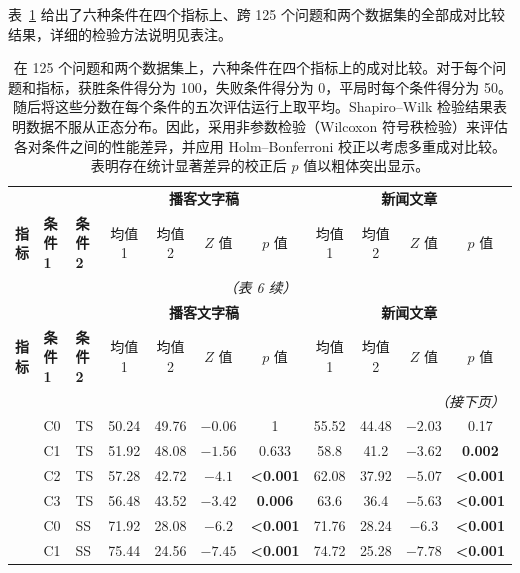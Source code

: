 \documentclass[11pt,UTF8,fontset=fandol]{ctexart}
\begin{document}
表~\ref{tab:6} 给出了六种条件在四个指标上、跨 125 个问题和两个数据集的全部成对比较结果，详细的检验方法说明见表注。

\begin{center}
\scriptsize
\setlength{\tabcolsep}{4pt}
\renewcommand{\arraystretch}{1.1}
\begin{longtable}{@{}lll cccc cccc@{}}
\caption{在 125 个问题和两个数据集上，六种条件在四个指标上的成对比较。对于每个问题和指标，获胜条件得分为 100，失败条件得分为 0，平局时每个条件得分为 50。随后将这些分数在每个条件的五次评估运行上取平均。Shapiro--Wilk 检验结果表明数据不服从正态分布。因此，采用非参数检验（Wilcoxon 符号秩检验）来评估各对条件之间的性能差异，并应用 Holm--Bonferroni 校正以考虑多重成对比较。表明存在统计显著差异的校正后 $p$ 值以粗体突出显示。}
\label{tab:6}\\
\toprule
& & & \multicolumn{4}{c}{\textbf{播客文字稿}} & \multicolumn{4}{c}{\textbf{新闻文章}} \\
\cmidrule(lr){4-7}\cmidrule(lr){8-11}
\textbf{指标} & \textbf{条件 1} & \textbf{条件 2} & 均值 1 & 均值 2 & $Z$ 值 & $p$ 值 & 均值 1 & 均值 2 & $Z$ 值 & $p$ 值 \\
\midrule
\endfirsthead
\multicolumn{11}{c}{\textit{（表 6 续）}}\\
\toprule
& & & \multicolumn{4}{c}{\textbf{播客文字稿}} & \multicolumn{4}{c}{\textbf{新闻文章}} \\
\cmidrule(lr){4-7}\cmidrule(lr){8-11}
\textbf{指标} & \textbf{条件 1} & \textbf{条件 2} & 均值 1 & 均值 2 & $Z$ 值 & $p$ 值 & 均值 1 & 均值 2 & $Z$ 值 & $p$ 值 \\
\midrule
\endhead
\midrule
\multicolumn{11}{r}{\textit{（接下页）}}\\
\endfoot
\bottomrule
\endlastfoot
\multirow{15}{*}{全面性}
 & C0 & TS & 50.24 & 49.76 & $-0.06$ & 1 & 55.52 & 44.48 & $-2.03$ & 0.17 \\
 & C1 & TS & 51.92 & 48.08 & $-1.56$ & 0.633 & 58.8 & 41.2 & $-3.62$ & \textbf{0.002} \\
 & C2 & TS & 57.28 & 42.72 & $-4.1$ & \textbf{<0.001} & 62.08 & 37.92 & $-5.07$ & \textbf{<0.001} \\
 & C3 & TS & 56.48 & 43.52 & $-3.42$ & \textbf{0.006} & 63.6 & 36.4 & $-5.63$ & \textbf{<0.001} \\
 & C0 & SS & 71.92 & 28.08 & $-6.2$ & \textbf{<0.001} & 71.76 & 28.24 & $-6.3$ & \textbf{<0.001} \\
 & C1 & SS & 75.44 & 24.56 & $-7.45$ & \textbf{<0.001} & 74.72 & 25.28 & $-7.78$ & \textbf{<0.001} \\

\end{longtable}
\end{center}
\end{document}
